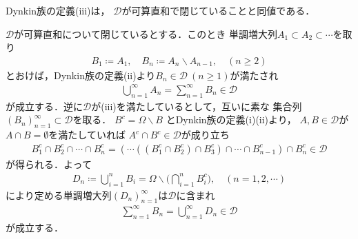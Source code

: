 \begin{screen}
	\begin{thm}
		Dynkin族の定義(iii)は，
		$\mathscr{D}$が可算直和で閉じていることと同値である．
	\end{thm}
\end{screen}

\begin{prf}
	$\mathscr{D}$が可算直和について閉じているとする．このとき
	単調増大列$A_1 \subset A_2 \subset \cdots$を取り
	\begin{align}
		B_1 \coloneqq A_1,
		\quad B_n \coloneqq A_n \backslash A_{n-1},
		\quad (n \geq 2)
	\end{align}
	とおけば，Dynkin族の定義(ii)より$B_n \in \mathscr{D}\ (n \geq 1)$が満たされ
	\begin{align}
		\bigcup_{n=1}^{\infty} A_n = \sum_{n=1}^{\infty} B_n \in \mathscr{D} 
	\end{align}
	が成立する．逆に$\mathscr{D}$が(iii)を満たしているとして，互いに素な
	集合列$(B_n)_{n=1}^{\infty} \subset \mathscr{D}$を取る．
	$B^c = \Omega \backslash B$
	とDynkin族の定義(i)(ii)より，
	$A,B \in \mathscr{D}$が$A \cap B = \emptyset$を満たしていれば
	$A^c \cap B^c \in \mathscr{D}$が成り立ち
	\begin{align}
		B_1^c \cap B_2^c \cap \cdots \cap B_n^c
		= \left( \cdots \left( \left( B_1^c \cap B_2^c \right) \cap B_3^c \right) \cap \cdots \cap B_{n-1}^c \right) \cap B_n^c
		\in \mathscr{D}
	\end{align}
	が得られる．よって
	\begin{align}
		D_n \coloneqq \bigcup_{i=1}^n B_i = \Omega \backslash \Biggl( \bigcap_{i=1}^n B_i^c \Biggr),
		\quad (n=1,2,\cdots)
	\end{align}
	により定める単調増大列$(D_n)_{n=1}^{\infty}$は$\mathscr{D}$に含まれ
	\begin{align}
		\sum_{n=1}^{\infty} B_n = \bigcup_{n=1}^{\infty} D_n \in \mathscr{D}
	\end{align}
	が成立する．
	\QED
\end{prf}

